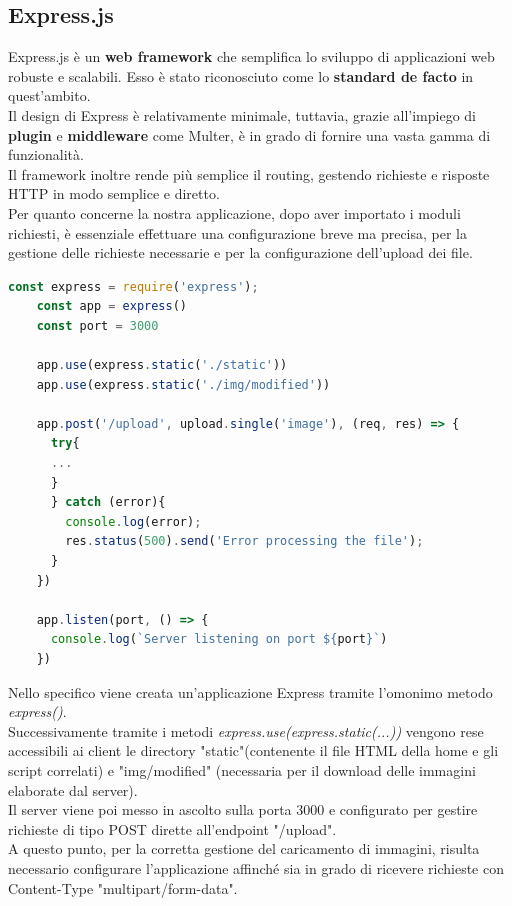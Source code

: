 \subsection{Express.js}
Express.js è un \textbf{web framework} che semplifica lo sviluppo di applicazioni web robuste e scalabili. Esso è stato riconosciuto come lo \textbf{standard de facto} in quest'ambito.
\\Il design di Express è relativamente minimale, tuttavia, grazie all'impiego di \textbf{plugin} e \textbf{middleware} come Multer, è in grado di fornire una vasta gamma di funzionalità.
\\Il framework inoltre rende più semplice il routing, gestendo richieste e risposte HTTP in modo semplice e diretto.
\\Per quanto concerne la nostra applicazione, dopo aver importato i moduli richiesti, è essenziale effettuare una configurazione breve ma precisa, per la gestione delle richieste necessarie e per la configurazione dell'upload dei file.
\begin{lstlisting}[language=JavaScript, caption={Configurazione Express.js}, showstringspaces=false]
    const express = require('express');
    const app = express()
    const port = 3000
        
    app.use(express.static('./static'))
    app.use(express.static('./img/modified'))
    
    app.post('/upload', upload.single('image'), (req, res) => {
      try{
      ...
      }
      } catch (error){
        console.log(error);
        res.status(500).send('Error processing the file');
      }
    })
    
    app.listen(port, () => {
      console.log(`Server listening on port ${port}`)
    })
\end{lstlisting}
Nello specifico viene creata un'applicazione Express tramite l'omonimo metodo \emph{express()}.
\\Successivamente tramite i metodi \emph{express.use(express.static(...))} vengono rese accessibili ai client le directory "static"(contenente il file HTML della home e gli script correlati) e "img/modified" (necessaria per il download delle immagini elaborate dal server).
\\Il server viene poi messo in ascolto sulla porta 3000 e configurato per gestire richieste di tipo POST dirette all'endpoint "/upload".
\\A questo punto, per la corretta gestione del caricamento di immagini, risulta necessario configurare l'applicazione affinché sia in grado di ricevere richieste con Content-Type "multipart/form-data".
